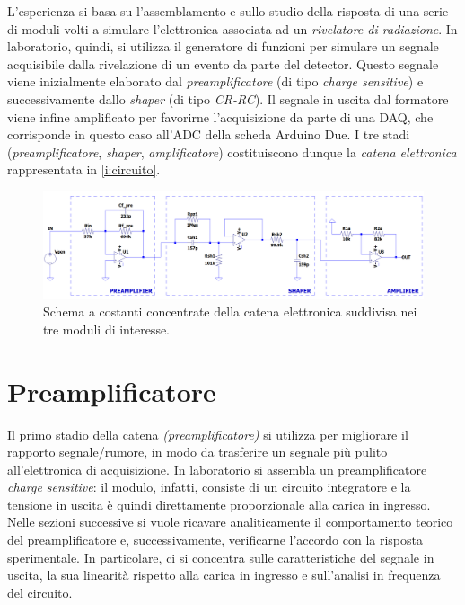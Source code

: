 \documentclass[a4paper,11pt]{article} %
\begin{document}
L'esperienza si basa su l'assemblamento e sullo studio della risposta di una serie di moduli volti a simulare
l'elettronica associata ad un \textit{rivelatore di radiazione}. In laboratorio, quindi, si utilizza il generatore di
funzioni per simulare un segnale acquisibile dalla rivelazione di un evento da parte del detector. Questo segnale viene
inizialmente elaborato dal \textit{preamplificatore} (di tipo \textit{charge sensitive}) e successivamente dallo
\textit{shaper} (di tipo \textit{CR-RC}). Il segnale in uscita dal formatore viene infine amplificato per favorirne
l'acquisizione da parte di una DAQ, che corrisponde in questo caso all'ADC della scheda Arduino Due. I tre stadi
(\textit{preamplificatore}, \textit{shaper}, \textit{amplificatore}) costituiscono dunque la \textit{catena elettronica}
rappresentata in \autoref{i:circuito}.
\begin{figure}[H]
	\centering
	\includegraphics[width=0.9\linewidth]{../Simulations/catena_circuito.png}
	\caption{\small Schema a costanti concentrate della catena elettronica suddivisa nei tre moduli di interesse.}
	\label{i:circuito}
\end{figure}



\section{Preamplificatore}\label{s:preamp} 

Il primo stadio della catena \textit{(preamplificatore)} si utilizza per migliorare il rapporto segnale/rumore, in modo
da trasferire un segnale più pulito all'elettronica di acquisizione. In laboratorio si assembla un preamplificatore
\textit{charge sensitive}: il modulo, infatti, consiste di un circuito integratore e la tensione in uscita è quindi
direttamente proporzionale alla carica in ingresso. Nelle sezioni successive si vuole ricavare analiticamente il
comportamento teorico del preamplificatore e, successivamente, verificarne l'accordo con la risposta sperimentale. In
particolare, ci si concentra sulle caratteristiche del segnale in uscita, la sua linearità rispetto alla carica in
ingresso e sull'analisi in frequenza del circuito.
\end{document}
